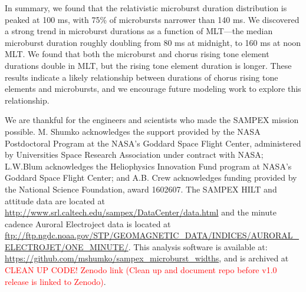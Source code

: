 \documentclass[draft]{agujournal2019}
\begin{document}
In summary, we found that the relativistic microburst duration distribution is peaked at 100 ms, with 75\% of microbursts narrower than 140 ms. We discovered a strong trend in microburst durations as a function of MLT---the median microburst duration roughly doubling from 80 ms at midnight, to 160 ms at noon MLT. We found that both the microburst and chorus rising tone element durations double in MLT, but the rising tone element duration is longer. These results indicate a likely relationship between durations of chorus rising tone elements and microbursts, and we encourage future modeling work to explore this relationship.


%
%
%
%

\acknowledgments
We are thankful for the engineers and scientists who made the SAMPEX mission possible. M. Shumko acknowledges the support provided by the NASA Postdoctoral Program at the NASA’s Goddard Space Flight Center, administered by Universities Space Research Association under contract with NASA; L.W.Blum acknowledges the Heliophysics Innovation Fund program at NASA’s Goddard Space Flight Center; and A.B. Crew acknowledges funding provided by the National Science Foundation, award 1602607. The SAMPEX HILT and attitude data are located at \url{http://www.srl.caltech.edu/sampex/DataCenter/data.html} and the minute cadence Auroral Electroject data is located at \url{ftp://ftp.ngdc.noaa.gov/STP/GEOMAGNETIC_DATA/INDICES/AURORAL_ELECTROJET/ONE_MINUTE/}.
This analysis software is available at: \url{https://github.com/mshumko/sampex_microburst_widths}, and is archived at \textcolor{red}{CLEAN UP CODE! Zenodo link (Clean up and document repo before v1.0 release is linked to Zenodo)}. 



%
%
\end{document}
